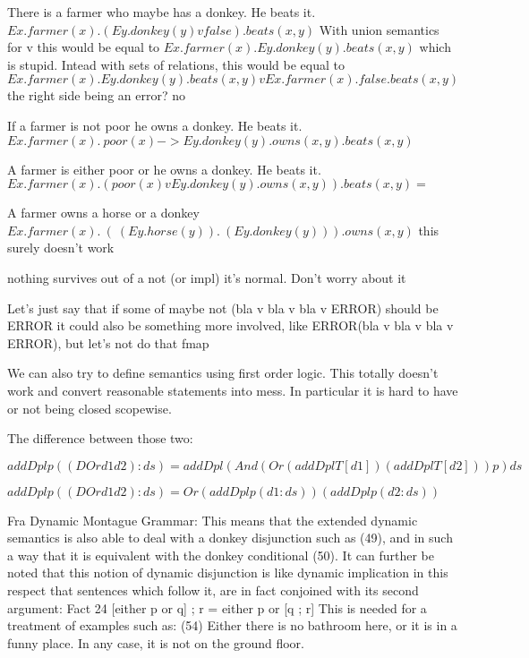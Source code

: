 \documentclass[12pt]{article}
\begin{document}
There is a farmer who maybe has a donkey. He beats it.
$Ex.farmer(x).(Ey.donkey(y) v false).beats(x,y)$
With union semantics for v this would be equal to
$Ex.farmer(x).Ey.donkey(y).beats(x,y)$
which is stupid.
Intead with sets of relations, this would be equal to
$Ex.farmer(x).Ey.donkey(y).beats(x,y) v Ex.farmer(x).false.beats(x,y)$
the right side being an error? no

If a farmer is not poor he owns a donkey. He beats it.
$Ex.farmer(x).~poor(x) -> Ey.donkey(y).owns(x,y).beats(x,y)$

A farmer is either poor or he owns a donkey. He beats it.
$Ex.farmer(x).(poor(x) v Ey.donkey(y).owns(x,y)).beats(x,y) =$




A farmer owns a horse or a donkey
$Ex.farmer(x).~(~(Ey.horse(y)).~(Ey.donkey(y))).owns(x,y)$   this surely doesn't work


nothing survives out of a not (or impl) it's normal. Don't worry about it

Let's just say that if some of 
maybe not (bla v bla v bla v ERROR) should be ERROR
it could also be something more involved, like ERROR(bla v bla v bla v ERROR), but let's not do that
fmap

We can also try to define semantics using first order logic. This totally doesn't work and convert reasonable statements into mess. In particular it is hard to have or not being closed scopewise.

The difference between those two:

$addDpl p ((DOr d1 d2):ds) = addDpl (And (Or (addDpl T [d1]) (addDpl T [d2])) p) ds$

$addDpl p ((DOr d1 d2):ds) = Or (addDpl p (d1:ds)) (addDpl p (d2:ds))$


Fra Dynamic Montague Grammar:
This means that the extended dynamic semantics is also able to deal with a donkey
disjunction such as (49), and in such a way that it is equivalent with the donkey
conditional (50). It can further be noted that this notion of dynamic disjunction is
like dynamic implication in this respect that sentences which follow it, are in fact
conjoined with its second argument:
Fact 24 [either p or q] ; r = either p or [q ; r]
This is needed for a treatment of examples such as:
(54) Either there is no bathroom here, or it is in a funny place. In any case, it is
not on the ground floor.
\end{document}
